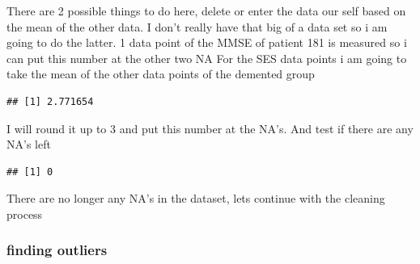 \documentclass[
]{article}
\newenvironment{Shaded}{\begin{snugshade}}{\end{snugshade}}
\newcommand{\CommentTok}[1]{\textcolor[rgb]{0.56,0.35,0.01}{\textit{#1}}}
\newcommand{\DecValTok}[1]{\textcolor[rgb]{0.00,0.00,0.81}{#1}}
\newcommand{\FunctionTok}[1]{\textcolor[rgb]{0.00,0.00,0.00}{#1}}
\newcommand{\NormalTok}[1]{#1}
\newcommand{\OtherTok}[1]{\textcolor[rgb]{0.56,0.35,0.01}{#1}}
\newcommand{\SpecialCharTok}[1]{\textcolor[rgb]{0.00,0.00,0.00}{#1}}
\begin{document}
There are 2 possible things to do here, delete or enter the data our
self based on the mean of the other data. I don't really have that big
of a data set so i am going to do the latter. 1 data point of the MMSE
of patient 181 is measured so i can put this number at the other two NA
For the SES data points i am going to take the mean of the other data
points of the demented group

\begin{Shaded}
\end{Shaded}

\begin{verbatim}
## [1] 2.771654
\end{verbatim}

I will round it up to 3 and put this number at the NA's. And test if
there are any NA's left

\begin{Shaded}
\end{Shaded}

\begin{verbatim}
## [1] 0
\end{verbatim}

There are no longer any NA's in the dataset, lets continue with the
cleaning process

\hypertarget{finding-outliers}{%
\subsubsection{finding outliers}\label{finding-outliers}}
\end{document}
